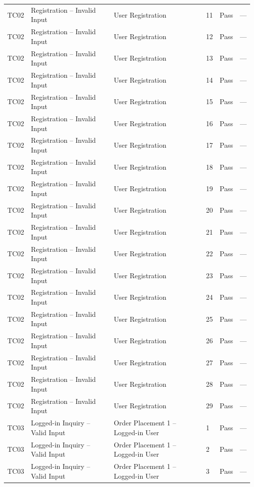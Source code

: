{\begin{longtable}{@{}p{1.2cm} p{4.2cm} p{4.4cm} p{0.8cm} p{0.9cm} p{1.6cm}@{}}
  TC02 & Registration -- Invalid Input & User Registration & 11 & Pass & --- \\
  TC02 & Registration -- Invalid Input & User Registration & 12 & Pass & --- \\
  TC02 & Registration -- Invalid Input & User Registration & 13 & Pass & --- \\
  TC02 & Registration -- Invalid Input & User Registration & 14 & Pass & --- \\
  TC02 & Registration -- Invalid Input & User Registration & 15 & Pass & --- \\
  TC02 & Registration -- Invalid Input & User Registration & 16 & Pass & --- \\
  TC02 & Registration -- Invalid Input & User Registration & 17 & Pass & --- \\
  TC02 & Registration -- Invalid Input & User Registration & 18 & Pass & --- \\
  TC02 & Registration -- Invalid Input & User Registration & 19 & Pass & --- \\
  TC02 & Registration -- Invalid Input & User Registration & 20 & Pass & --- \\
  TC02 & Registration -- Invalid Input & User Registration & 21 & Pass & --- \\
  TC02 & Registration -- Invalid Input & User Registration & 22 & Pass & --- \\
  TC02 & Registration -- Invalid Input & User Registration & 23 & Pass & --- \\
  TC02 & Registration -- Invalid Input & User Registration & 24 & Pass & --- \\
  TC02 & Registration -- Invalid Input & User Registration & 25 & Pass & --- \\
  TC02 & Registration -- Invalid Input & User Registration & 26 & Pass & --- \\
  TC02 & Registration -- Invalid Input & User Registration & 27 & Pass & --- \\
  TC02 & Registration -- Invalid Input & User Registration & 28 & Pass & --- \\
  TC02 & Registration -- Invalid Input & User Registration & 29 & Pass & --- \\
  \midrule
  TC03 & Logged-in Inquiry -- Valid Input & Order Placement 1 -- Logged-in User & 1 & Pass & --- \\
  TC03 & Logged-in Inquiry -- Valid Input & Order Placement 1 -- Logged-in User & 2 & Pass & --- \\
  TC03 & Logged-in Inquiry -- Valid Input & Order Placement 1 -- Logged-in User & 3 & Pass & --- \\

\end{longtable}}
